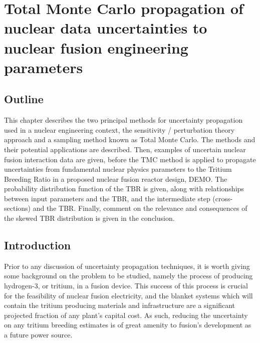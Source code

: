 
\chapter{Total Monte Carlo propagation of nuclear data uncertainties to nuclear fusion engineering parameters} %
\label{chap:tmc}

\ifpdf
    \graphicspath{{Chapter1/Figs/Raster/}{Chapter1/Figs/PDF/}{Chapter1/Figs/}}
\else
    \graphicspath{{Chapter1/Figs/Vector/}{Chapter1/Figs/}}
\fi


\section{Outline}
This chapter describes the two principal methods for uncertainty propagation used in a nuclear engineering context, the sensitivity / perturbation theory approach and a sampling method known as Total Monte Carlo. The methods and their potential applications are described. Then, examples of uncertain nuclear fusion interaction data are given, before the TMC method is applied to propagate uncertainties from fundamental nuclear physics parameters to the Tritium Breeding Ratio in a proposed nuclear fusion reactor design, DEMO. The probability distribution function of the TBR is given, along with relationships between input parameters and the TBR, and the intermediate step (cross-sections) and the TBR. Finally, comment on the relevance and consequences of the skewed TBR distribution is given in the conclusion.


\section{Introduction}
\label{introduction}
Prior to any discussion of uncertainty propagation techniques, it is worth giving some background on the problem to be studied, namely the process of producing hydrogen-3, or tritium, in a fusion device. This success of this process is crucial for the feasibility of nuclear fusion electricity, and the blanket systems which will contain the tritium producing materials and infrastructure are a significant projected fraction of any plant's capital cost. As such, reducing the uncertainty on any tritium breeding estimates is of great amenity to fusion's development as a future power source.

